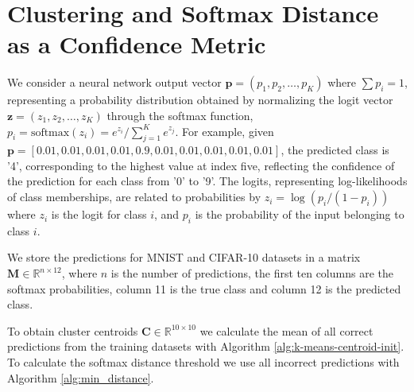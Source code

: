 
\section{Clustering and Softmax Distance as a Confidence Metric}
\label{methods:clustering}

We consider a neural network output vector $\mathbf{p} = (p_1, p_2, \dots, p_K)$ where $\sum p_i = 1$, representing a probability distribution obtained by normalizing the logit vector $\mathbf{z} = (z_1, z_2, \dots, z_K)$ through the softmax function, $p_i = \text{softmax}(z_i) = e^{z_i} / \sum_{j=1}^{K} e^{z_j}$. For example, given $\mathbf{p} = [0.01, 0.01, 0.01, 0.01, 0.9, 0.01, 0.01, 0.01, 0.01, 0.01]$, the predicted class is '4', corresponding to the highest value at index five, reflecting the confidence of the prediction for each class from '0' to '9'. The logits, representing log-likelihoods of class memberships, are related to probabilities by $z_i = \log (p_i / (1 - p_i))$ where $z_i$ is the logit for class $i$, and $p_i$ is the probability of the input belonging to class $i$\cite{goodfellow2016deep, bishop2006pattern}.

We store the predictions for MNIST and CIFAR-10 datasets in a matrix $\mathbf{M} \in \mathbb{R}^{n \times 12}$, where $n$ is the number of predictions, the first ten columns are the softmax probabilities, column 11 is the true class and column 12 is the predicted class.

To obtain cluster centroids $\mathbf{C} \in \mathbb{R}^{10 \times 10}$ we calculate the mean of all correct predictions from the training datasets with Algorithm \ref{alg:k-means-centroid-init}. To calculate the softmax distance threshold we use all incorrect predictions with Algorithm \ref{alg:min_distance}.

